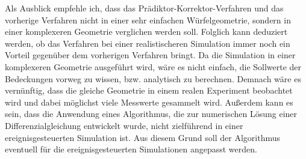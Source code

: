 \documentclass{listhesis}
\begin{document}
Als Ausblick empfehle ich, dass das Prädiktor-Korrektor-Verfahren und das vorherige Verfahren nicht in einer sehr einfachen Würfelgeometrie, sondern in einer komplexeren Geometrie verglichen werden soll. Folglich kann deduziert werden, ob das Verfahren bei einer realistischeren Simulation immer noch ein Vorteil gegenüber dem vorherigen Verfahren bringt. Da die Simulation in einer komplexeren Geometrie ausgeführt wird, wäre es nicht einfach, die Sollwerte der Bedeckungen vorweg zu wissen, bzw. analytisch zu berechnen. Demnach wäre es vernünftig, dass die gleiche Geometrie in einem realen Experiment beobachtet wird und dabei möglichst viele 	Messwerte gesammelt wird. Außerdem kann es sein, dass die Anwendung eines Algorithmus, die zur numerischen Lösung einer Differenzialgleichung entwickelt wurde, nicht zielführend in einer ereignisgesteuerten Simulation ist. Aus diesem Grund soll der Algorithmus eventuell für die ereignisgesteuerten Simulationen angepasst werden.


\cleardoublepage



\confirmation
\end{document}
